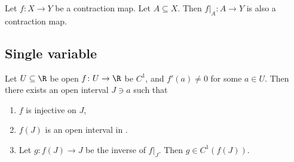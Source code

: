 \begin{remark}
    Let $f\colon X \to Y$ be a contraction map.
    Let $A \subseteq X$.
    Then $f\vert_A\colon A \to Y$ is also a contraction map.
\end{remark}

\subsection{Single variable} \label{sec:ift-1d}
\begin{theorem*} \label{thm:ift-1d}
    Let $U \subseteq \R$ be open $f\colon U \to \R$ be $C^1$,
    and $f'(a) \ne 0$ for some $a \in U$.
    Then there exists an open interval $J \ni a$ such that
    \begin{enumerate}
        \item $f$ is injective on $J$,
        \item $f(J)$ is an open interval in \R.
        \item Let $g\colon f(J) \to J$ be the inverse of $f\vert_J$.
        Then $g \in C^1(f(J))$.
    \end{enumerate}
\end{theorem*}
